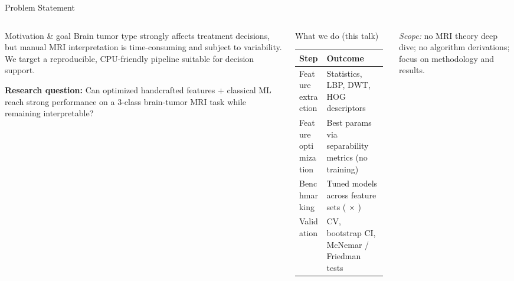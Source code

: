 \begin{frame}{Problem Statement}
  \begin{columns}[T,onlytextwidth]
    \begin{block}{Motivation \& goal}
      Brain tumor type strongly affects treatment decisions, but manual MRI interpretation
      is time-consuming and subject to variability. We target a reproducible,
      CPU-friendly pipeline suitable for decision support.\vspace{0.3em}

      \textbf{Research question:} Can optimized handcrafted features + classical ML reach strong
      performance on a 3-class brain-tumor MRI task while remaining interpretable?
    \end{block}

    \begin{block}{What we do (this talk)}
      \scriptsize
      \begin{tabular}{@{}p{0.30\linewidth}p{0.66\linewidth}@{}}
        \toprule
        \textbf{Step} & \textbf{Outcome} \\
        \midrule
        Feature extraction & Statistics, LBP, DWT, HOG descriptors \\
        Feature optimization & Best params via separability metrics (no training) \\
        Benchmarking & Tuned models across feature sets (\NModels{} $\times$ \NFeatureSets{}) \\
        Validation & CV, bootstrap CI, McNemar / Friedman tests \\
        \bottomrule
      \end{tabular}
    \end{block}

    \vspace{-0.2em}
    {\scriptsize \textit{Scope:} no MRI theory deep dive; no algorithm derivations; focus on methodology and results.}
  \end{columns}
\end{frame}

